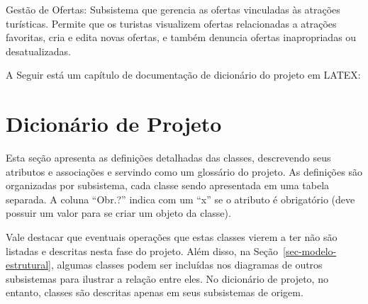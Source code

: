 Gestão de Ofertas:
Subsistema que gerencia as ofertas vinculadas às atrações turísticas. Permite que os turistas visualizem ofertas relacionadas a atrações favoritas, cria e edita novas ofertas, e também denuncia ofertas inapropriadas ou desatualizadas.


A Seguir está um capítulo de documentação de dicionário do projeto em LATEX:

\chapter{Dicionário de Projeto}
\label{sec-dicionario}
\vspace{-1cm}

Esta seção apresenta as definições detalhadas das classes, descrevendo seus atributos e associações e servindo como um glossário do projeto. As definições são organizadas por subsistema, cada classe sendo apresentada em uma tabela separada. A coluna ``Obr.?'' indica com um ``x'' se o atributo é obrigatório (deve possuir um valor para se criar um objeto da classe).

Vale destacar que eventuais operações que estas classes vierem a ter não são listadas e descritas nesta fase do projeto. Além disso, na Seção~\ref{sec-modelo-estrutural}, algumas classes podem ser incluídas nos diagramas de outros subsistemas para ilustrar a relação entre eles. No dicionário de projeto, no entanto, classes são descritas apenas em seus subsistemas de origem.




